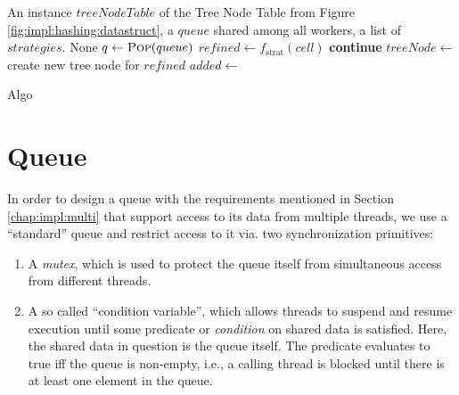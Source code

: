 		\begin{algorithm}[ht!]
			\centering
			\begin{algorithmic}
				\Require An instance $treeNodeTable$ of the Tree Node Table from Figure \ref{fig:impl:hashing:datastruct}, a $queue$ shared among all workers, a list of $strategies$.
				\Ensure None
				\Statex
							\State \Return {}
						\EndIf
						\State $q \gets \Call{Pop}{queue}$
								\State $refined \gets f_{\mathrm{strat}}(cell)$
									\State \textbf{continue}
								\EndIf
								\State $treeNode \gets$ create new tree node for $refined$
								\State $added \gets $ 
								 
									\State {}
								\EndIf
							\EndFor
						\EndFor
					\EndWhile
				\EndFunction
			\end{algorithmic}
			\caption{Algo}
			\label{algo:impl:queue}
		\end{algorithm}

		\clearpage

		\section{Queue}
		\label{chap:impl:threading:queue}

			In order to design a queue with the requirements mentioned in Section \ref{chap:impl:multi} that support access to its data from multiple threads, we use a \enquote{standard} queue and restrict access to it via. two synchronization primitives:

			\begin{enumerate}
				\item A \textit{mutex}, which is used to protect the queue itself from simultaneous access from different threads.
				\item A so called \enquote{condition variable}, which allows threads to suspend and resume execution until some predicate or \textit{condition} on shared data is satisfied. Here, the shared data in question is the queue itself. The predicate evaluates to true iff the queue is non-empty, i.e., a calling thread is blocked until there is at least one element in the queue.
			\end{enumerate}

